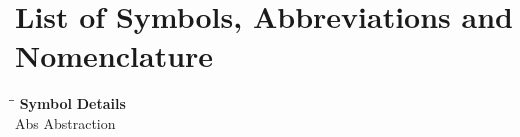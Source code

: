 \chapter*{List of Symbols, Abbreviations and Nomenclature}
\begin{tabbing}
\hspace{1in}\=\hspace{1in}\= \kill
\textbf{Symbol}\> \textbf{Details}\\
Abs\> Abstraction\\
 \> 
\end{tabbing} 